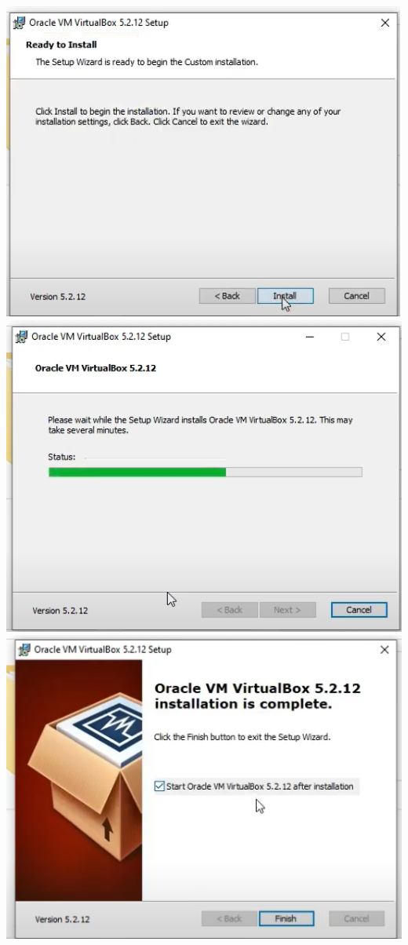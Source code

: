 \documentclass{article}
\begin{document}
\begin{flushleft}
\begin{enumerate}
        		\begin{center}
        			\includegraphics[scale=0.7]{Screenshot (256)} 
        			\includegraphics[scale=0.7]{Screenshot (257)} 
        			\includegraphics[scale=0.7]{Screenshot (258)} 
        		\end{center}
        		

\end{enumerate}
\end{flushleft}
\end{document}
